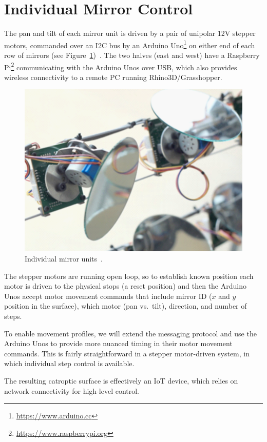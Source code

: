 \section{Individual Mirror Control}
\label{sec:mirror}

The pan and tilt of each mirror unit is driven by a pair of
unipolar 12V stepper motors, commanded over an I2C bus by an
Arduino Uno\footnote{\url{https://www.arduino.cc}} on either end of
each row of mirrors (see Figure~\ref{fig:mirror})~\cite{acadia18}.
The two halves (east and west) have a
Raspberry Pi\footnote{\url{https://www.raspberrypi.org}}
communicating with the Arduino Unos over USB, which also provides
wireless connectivity to a remote PC running Rhino3D/Grasshopper.

\begin{figure}[ht]
\includegraphics[width=0.6\columnwidth]{mirror}
\caption{Individual mirror units~\protect\cite{acadia18}.}
\label{fig:mirror}
\end{figure}

The stepper motors are running open loop,
so to establish known position each
motor is driven to the physical stops (a reset position) and then
the Arduino Unos accept motor movement commands that include
mirror ID ($x$ and $y$ position in the surface), which motor (pan vs.\ tilt),
direction, and number of steps.

To enable movement profiles, we will extend the messaging protocol
and use the Arduino Unos to provide more nuanced timing in their
motor movement commands. This is fairly straightforward in a stepper
motor-driven system, in which individual step control is available.

The resulting catroptic surface is effectively an IoT device, which
relies on network connectivity for high-level control.
